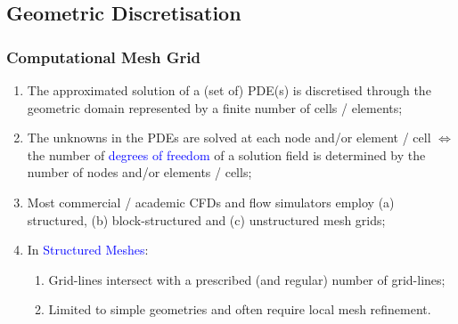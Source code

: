 \documentclass[10pt,compress,handout,ignorenonframetext]{beamer}
\begin{document}
\subsection{Geometric Discretisation}

\begin{frame}
 \frametitle{Computational Mesh Grid} 
 \begin{enumerate}
   \item <1-> The approximated solution of a (set of) PDE(s) is discretised through the geometric domain represented by a finite number of cells / elements;
   \item <2-> The unknowns in the PDEs are solved at each node and/or element / cell $\Longleftrightarrow$ the number of \textcolor{blue}{degrees of freedom} of a solution field is determined by the number of nodes and/or elements / cells;
   \item <3-> Most commercial / academic CFDs and flow simulators employ (a) structured, (b) block-structured and (c) unstructured mesh grids; 
    \item <4-> In \textcolor{blue}{Structured Meshes}:
    \begin{enumerate}
       \item <5-> Grid-lines intersect with a prescribed (and regular) number of grid-lines; 
       \item <6-> Limited to simple geometries and often require local mesh refinement.
    \end{enumerate}  
 \end{enumerate}  

\end{frame}
\end{document}
